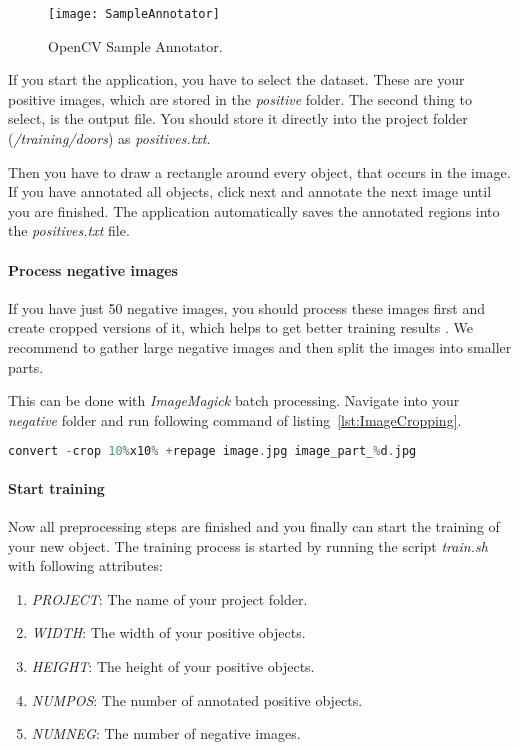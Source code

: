 \begin{figure}[H]
	\centering
	\texttt{[image: SampleAnnotator]}
	\caption{OpenCV Sample Annotator.}
	\label{fig:SampleAnnotator}
\end{figure}

If you start the application, you have to select the dataset. These are your positive images, which are stored in the \textit{positive} folder. The second thing to select, is the output file. You should store it directly into the project folder (\textit{/training/doors}) as \textit{positives.txt}.

Then you have to draw a rectangle around every object, that occurs in the image. If you have annotated all objects, click next and annotate the next image until you are finished. The application automatically saves the annotated regions into the \textit{positives.txt} file.


\paragraph{Process negative images}
If you have just 50 negative images, you should process these images first and create cropped versions of it, which helps to get better training results \citep{ball}. We recommend to gather large negative images and then split the images into smaller parts.

This can be done with \textit{ImageMagick} batch processing. Navigate into your \textit{negative} folder and run following command of listing~\ref{lst:ImageCropping}.

\begin{lstlisting}[caption={Image cropping.}, label={lst:ImageCropping}, language=Kotlin, escapechar=$]
convert -crop 10%x10% +repage image.jpg image_part_%d.jpg
\end{lstlisting}

\paragraph{Start training}
Now all preprocessing steps are finished and you finally can start the training of your new object. The training process is started by running the script \textit{train.sh} with following attributes:

\begin{enumerate}
    \item \textit{PROJECT}: The name of your project folder.
    \item \textit{WIDTH}: The width of your positive objects.
    \item \textit{HEIGHT}: The height of your positive objects.
    \item \textit{NUMPOS}: The number of annotated positive objects.
    \item \textit{NUMNEG}: The number of negative images.
\end{enumerate}

